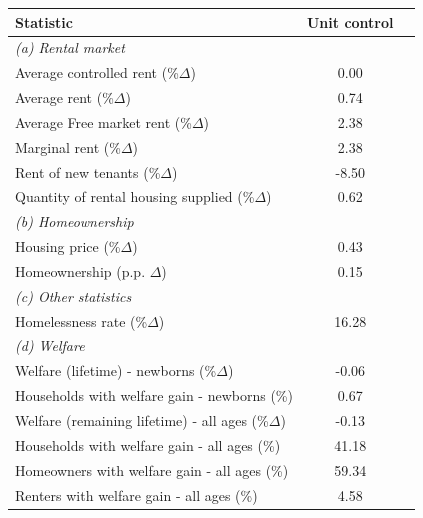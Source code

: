 \begin{table}[p]
\tiny
\renewcommand{\arraystretch}{1.2}
\renewcommand{\cellalign}{bc}
\begin{center}
\begin{tabular}{lcc}
\toprule
Statistic & Unit control \\
\midrule
\multicolumn{2}{l}{\textit{(a) Rental market}}\\
Average controlled rent (\%$\Delta$) & 0.00  \\
Average rent (\%$\Delta$) & 0.74\\
Average Free market rent (\%$\Delta$) & 2.38 \\
Marginal rent (\%$\Delta$) & 2.38  \\
Rent of new tenants (\%$\Delta$) & -8.50  \\
Quantity of rental housing supplied (\%$\Delta$) & 0.62  \\
\multicolumn{2}{l}{\textit{(b) Homeownership}}\\
Housing price (\%$\Delta$) & 0.43  \\
Homeownership (p.p. $\Delta$) & 0.15  \\
\multicolumn{2}{l}{\textit{(c) Other statistics}}\\
Homelessness rate (\%$\Delta$) & 16.28  \\
\multicolumn{2}{l}{\textit{(d) Welfare}}\\
Welfare (lifetime) - newborns (\%$\Delta$) & -0.06  \\
Households with welfare gain - newborns (\%) & 0.67  \\
Welfare (remaining lifetime) - all ages (\%$\Delta$) & -0.13  \\
Households with welfare gain - all ages (\%) & 41.18 \\
\quad Homeowners with welfare gain - all ages (\%) & 59.34  \\
\quad Renters with welfare gain - all ages (\%) & 4.58 \\
\bottomrule
\end{tabular}
\end{center}
\normalsize
\end{table}